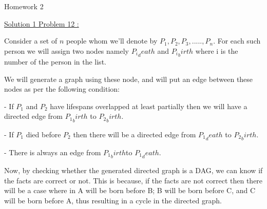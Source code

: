 \documentclass[letterpaper,portrait,12pt]{article}
\begin{document}
\begin{center}

\end{center}


\begin{center}
{\huge \newpage
}
\end{center}


\begin{center}
{\huge Homework 2}
\end{center}


\begin{flushleft}
\uline{Solution 1 Problem 12 :}
\end{flushleft}


\begin{flushleft}

\end{flushleft}


\begin{flushleft}
Consider a set of $n$ people whom we'll denote by $P_1,P_2,P_3,.....,P_n$. For each such person we will assign two nodes namely ${P_i}_death$ and ${P_i}_birth$ where i is the number of the person in the list.
\end{flushleft}


\begin{flushleft}
We will generate a graph using these node, and will put an edge between these nodes as per the following condition:
\end{flushleft}


\begin{flushleft}
	- If $P_1 $ and $P_2$ have lifespans overlapped at least partially then we will have a directed edge from ${P_1}_birth $ to ${P_2}_birth$.
\end{flushleft}


\begin{flushleft}
	- If $P_1$ died before $P_2$ then there will be a directed edge from  ${P_1}_death$ to ${P_2}_birth$.
\end{flushleft}


\begin{flushleft}
	- There is always an edge from ${P_1}_birth$to ${P_1}_death$.
\end{flushleft}


\begin{flushleft}

\end{flushleft}


\begin{flushleft}
Now, by checking whether the generated directed graph is a DAG, we can know if the facts are correct or not. This is because, if the facts are not correct then there will be a case where in A will be born before B; B will be born before C, and C will be born before A, thus resulting in a cycle in the directed graph.
\end{flushleft}
\end{document}
